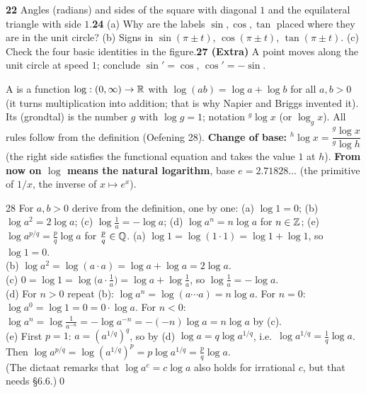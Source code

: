 \begin{trybox}[{22, 24, 27 (Extra)}]
\textbf{22} Angles (radians) and sides of the square with diagonal $1$ and the equilateral triangle with side $1$.\quad \textbf{24} (a) Why are the labels $\sin,\cos,\tan$ placed where they are in the unit circle? (b) Signs in $\sin(\pi\pm t)$, $\cos(\pi\pm t)$, $\tan(\pi\pm t)$. (c) Check the four basic identities in the figure.\quad \textbf{27 (Extra)} A point moves along the unit circle at speed $1$; conclude $\sin'=\cos$, $\cos'=-\sin$.
\end{trybox}


\begin{key}
A  is a function $\log:(0,\infty)\to\mathbb{R}$ with $\log(ab)=\log a+\log b$ for all $a,b>0$ (it turns multiplication into addition; that is why Napier and Briggs invented it). Its  (grondtal) is the number $g$ with $\log g=1$; notation ${}^g\!\log x$ (or $\log_gx$). All rules follow from the definition (Oefening 28). \textbf{Change of base:} ${}^h\!\log x=\dfrac{{}^g\!\log x}{{}^g\!\log h}$ (the right side satisfies the functional equation and takes the value $1$ at $h$). \textbf{From now on $\log$ means the natural logarithm}, base $e=2.71828\dots$ (the primitive of $1/x$, the inverse of $x\mapsto e^x$).
\end{key}

\begin{bookex}{28}
For $a,b>0$ derive from the definition, one by one: (a) $\log1=0$; (b) $\log a^2=2\log a$; (c) $\log\frac1a=-\log a$; (d) $\log a^n=n\log a$ for $n\in\mathbb{Z}$; (e) $\log a^{p/q}=\frac pq\log a$ for $\frac pq\in\mathbb{Q}$.
\solution
(a) $\log1=\log(1\cdot1)=\log1+\log1$, so $\log1=0$.\\
(b) $\log a^2=\log(a\cdot a)=\log a+\log a=2\log a$.\\
(c) $0=\log1=\log\big(a\cdot\tfrac1a\big)=\log a+\log\tfrac1a$, so $\log\tfrac1a=-\log a$.\\
(d) For $n>0$ repeat (b): $\log a^n=\log(a\cdots a)=n\log a$. For $n=0$: $\log a^0=\log1=0=0\cdot\log a$. For $n<0$: $\log a^n=\log\frac1{a^{-n}}=-\log a^{-n}=-(-n)\log a=n\log a$ by (c).\\
(e) First $p=1$: $a=(a^{1/q})^q$, so by (d) $\log a=q\log a^{1/q}$, i.e.\ $\log a^{1/q}=\frac1q\log a$. Then $\log a^{p/q}=\log(a^{1/q})^p=p\log a^{1/q}=\frac pq\log a$.\\
(The dictaat remarks that $\log a^c=c\log a$ also holds for irrational $c$, but that needs \S6.6.)\qed
\end{bookex}

